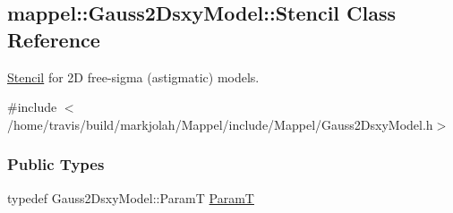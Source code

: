 \hypertarget{classmappel_1_1Gauss2DsxyModel_1_1Stencil}{}\subsection{mappel\+:\+:Gauss2\+Dsxy\+Model\+:\+:Stencil Class Reference}
\label{classmappel_1_1Gauss2DsxyModel_1_1Stencil}


\hyperlink{classmappel_1_1Gauss2DsxyModel_1_1Stencil}{Stencil} for 2D free-\/sigma (astigmatic) models.  




{\ttfamily \#include $<$/home/travis/build/markjolah/\+Mappel/include/\+Mappel/\+Gauss2\+Dsxy\+Model.\+h$>$}

\subsubsection*{Public Types}
\begin{DoxyCompactItemize}
\item 
typedef Gauss2\+Dsxy\+Model\+::\+ParamT \hyperlink{classmappel_1_1Gauss2DsxyModel_1_1Stencil_a73f8f8811eb4ea2e45476a45e188c06d}{ParamT}
\end{DoxyCompactItemize}
